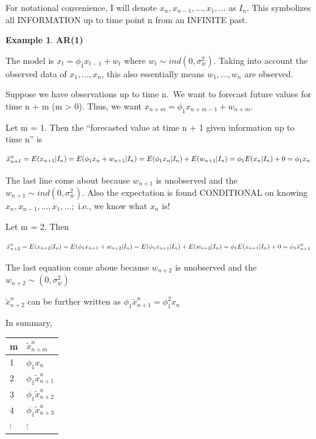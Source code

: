 \documentclass[
]{book}
\theoremstyle{definition}
\theoremstyle{definition}
\newtheorem{example}{Example}[chapter]
\theoremstyle{definition}
\theoremstyle{definition}
\theoremstyle{remark}
\begin{document}
For notational convenience, I will denote \(x_n, x_{n-1}, …, x_1,…\) as \(I_n\). This symbolizes all INFORMATION up to time point n from an INFINITE past.

\begin{example}

\textbf{AR(1)}

The model is \(x_t = \phi_1x_{t-1} + w_t\) where \(w_t \sim ind(0,\sigma_w^2)\). Taking into account the observed data of \(x_1, …, x_n\), this also essentially means \(w_1, …, w_n\) are observed.

Suppose we have observations up to time n.~We want to forecast future values for time n + m (m \textgreater{} 0). Thus, we want \(x_{n+m} = \phi_1x_{n+m-1} + w_{n+m}.\)

Let m = 1. Then the ``forecasted value at time n + 1 given information up to time n'' is

\[\tilde x^n_{n+1}  = E(x_{n+1}|I_n)\\
= E(\phi_1x_n + w_{n+1} |I_n)\\
= E(\phi_1x_n |I_n) + E(w_{n+1} |I_n)\\
= \phi_1E(x_n |I_n) + 0=\phi_1x_n\]

The last line come about because \(w_{n+1}\) is unobserved and the \(w_{n+1} \sim ind(0,\sigma_w^2)\). Also the expectation is found CONDITIONAL on knowing \(x_n, x_{n-1},…, x_1,…;\) i.e., we know what \(x_n\) is!

Let m = 2. Then

\[\tilde x^n_{n+2}  = E(x_{n+2}|I_n)\\
= E(\phi_1x_{n+1} + w_{n+2} |I_n)\\
= E(\phi_1x_{n+1} |I_n) + E(w_{n+2} |I_n)\\
= \phi_1E(x_{n+1} |I_n) + 0=\phi_1\tilde x^n_{n+1}\]

The last equation come aboue because \(w_{n+2}\) is unobserved and the \(w_{n+2} \sim (0, \sigma_w^2)\)

\(\tilde x^n_{n+2}\) can be further written as \(\phi_1 \tilde x_{n+1}^n =\phi_1^2x_n\)

In summary,

\begin{longtable}[]{@{}ll@{}}
\toprule()
m & \(\tilde x^n_{n+m}\) \\
\midrule()
\endhead
1 & \(\phi_1x_n\) \\
2 & \(\phi_1 \tilde x_{n+1}^n\) \\
3 & \(\phi_1 \tilde x_{n+2}^n\) \\
4 & \(\phi_1 \tilde x_{n+3}^n\) \\
\(\vdots\) & \(\vdots\) \\
\bottomrule()
\end{longtable}


\end{example}
\end{document}
